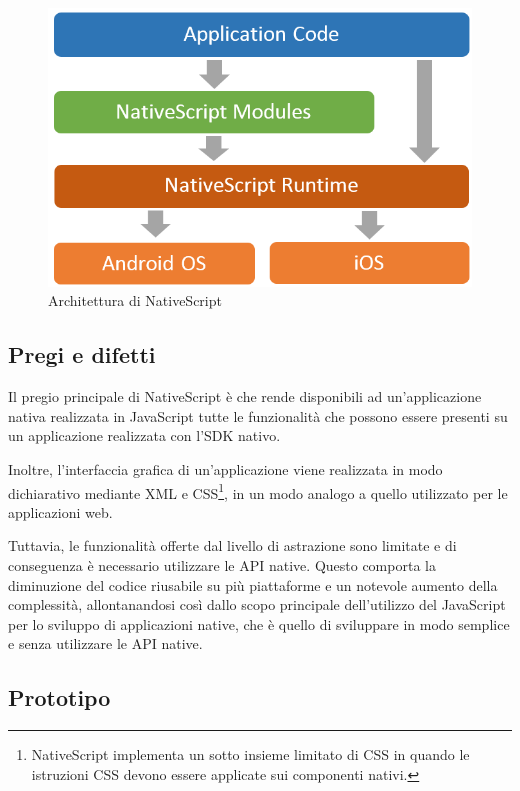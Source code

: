 \begin{figure}[htp]
\centering
\includegraphics[width=\textwidth/2]{../immagini/ns-architecture}
\caption{Architettura di NativeScript}  
\end{figure}
\FloatBarrier

\subsection{Pregi e difetti}

Il pregio principale di NativeScript è che rende disponibili ad un'applicazione nativa realizzata in JavaScript tutte le funzionalità che possono essere presenti su un applicazione realizzata con l'SDK nativo. 

Inoltre, l'interfaccia grafica di un'applicazione viene realizzata in modo dichiarativo mediante XML e CSS\footnote{NativeScript implementa un sotto insieme limitato di CSS in quando le istruzioni CSS devono essere applicate sui componenti nativi.}, in un modo analogo a quello utilizzato per le applicazioni web.

Tuttavia, le funzionalità offerte dal livello di astrazione sono limitate e di conseguenza è necessario utilizzare le API native.
Questo comporta la diminuzione del codice riusabile su più piattaforme e un notevole aumento della complessità, allontanandosi così dallo scopo principale dell'utilizzo del JavaScript per lo sviluppo di applicazioni native, che è quello di sviluppare in modo semplice e senza utilizzare le API native.

\subsection{Prototipo}


